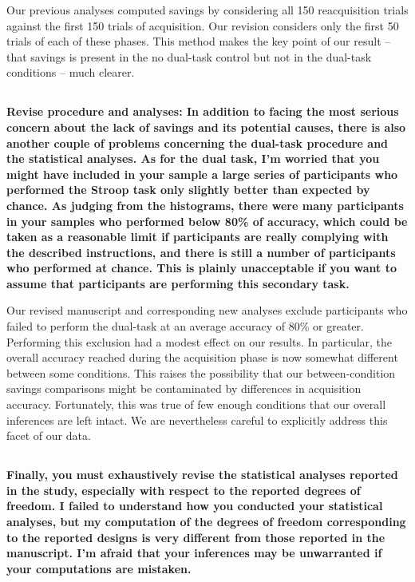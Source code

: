 \documentclass[10pt,a4paper]{article}
\begin{document}
Our previous analyses computed savings by considering all 150 reacquisition
trials against the first 150 trials of acquisition. Our revision considers only
the first 50 trials of each of these phases. This method makes the key point of
our result -- that savings is present in the no dual-task control but not in the
dual-task conditions -- much clearer.

\subsection{} \textbf{Revise procedure and analyses: In addition to facing the
most serious concern about the lack of savings and its potential causes, there
is also another couple of problems concerning the dual-task procedure and the
statistical analyses. As for the dual task, I'm worried that you might have
included in your sample a large series of participants who performed the Stroop
task only slightly better than expected by chance. As judging from the
histograms, there were many participants in your samples who performed below
80\% of accuracy, which could be taken as a reasonable limit if participants are
really complying with the described instructions, and there is still a number of
participants who performed at chance. This is plainly unacceptable if you want
to assume that participants are performing this secondary task.}

Our revised manuscript and corresponding new analyses exclude participants who failed to perform the dual-task at an average accuracy of 80\% or greater. Performing this exclusion had a modest effect on our results. In particular, the
overall accuracy reached during the acquisition phase is now somewhat different between some conditions. This raises the possibility that our between-condition savings comparisons might be contaminated by differences in acquisition accuracy. Fortunately, this was true of few enough conditions that our overall inferences
are left intact. We are nevertheless careful to explicitly address this facet of
our data.

\subsection{} \textbf{Finally, you must exhaustively revise the statistical
analyses reported in the study, especially with respect to the reported degrees of freedom. I failed to understand how you conducted your statistical analyses, but my computation of the degrees of freedom corresponding to the
reported designs is very different from those reported in the manuscript. I'm afraid that your inferences may be unwarranted if your computations are mistaken.}
\end{document}
